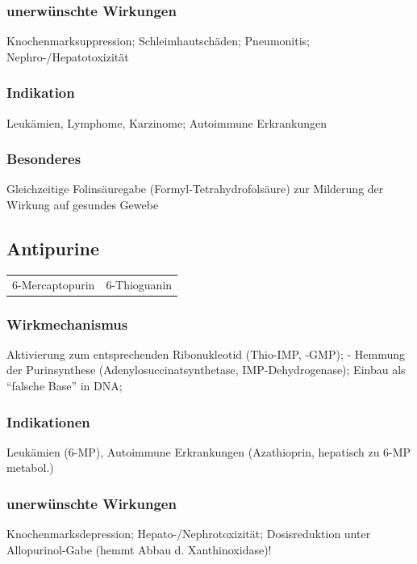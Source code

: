 \documentclass[10pt,a4paper]{report}
\begin{document}
\subsubsection{unerwünschte Wirkungen} %
\label{par:unerw_nschte_wirkungen}
Knochenmarksuppression; Schleimhautschäden;  Pneumonitis; Nephro-/Hepatotoxizität
\subsubsection{Indikation} %
\label{par:indikation}
Leukämien, Lymphome, Karzinome;  Autoimmune Erkrankungen
\subsubsection{Besonderes} %
\label{par:besonderes}
Gleichzeitige Folinsäuregabe (Formyl-Tetrahydrofolsäure) zur Milderung der Wirkung auf gesundes Gewebe 
\subsection{Antipurine} %
\label{sub:antipurine}
\begin{tabularx}{\textwidth}{XX}
6-Mercaptopurin&6-Thioguanin\\  
\end{tabularx}
\subsubsection{Wirkmechanismus} %
\label{par:wirkmechanismus}
Aktivierung zum entsprechenden Ribonukleotid (Thio-IMP, -GMP); - Hemmung der Purinsynthese (Adenylosuccinatsynthetase, IMP-Dehydrogenase); Einbau als “falsche Base” in DNA; 
\subsubsection{Indikationen} %
\label{par:indikationen}
 Leukämien (6-MP), Autoimmune Erkrankungen (Azathioprin, hepatisch zu 6-MP metabol.)
\subsubsection{unerwünschte Wirkungen} %
\label{par:unerw_nschte_wirkun}
Knochenmarksdepression; Hepato-/Nephrotoxizität; Dosisreduktion unter Allopurinol-Gabe (hemmt Abbau d. Xanthinoxidase)!
\end{document}
